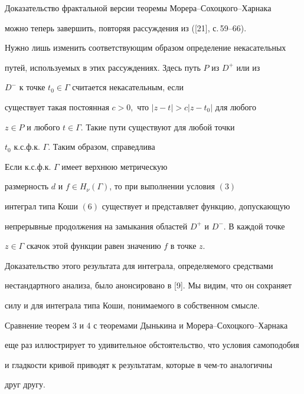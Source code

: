 Доказательство фрактальной версии теоремы Морера--Сохоцкого--Харнака


можно теперь завершить, повторяя рассуждения из ([21], с.\,59--66).


Нужно лишь изменить соответствующим образом определение некасательных


путей, используемых в этих рассуждениях. Здесь путь $P$ из $D^+$ или из


$D^-$ к точке $t_0\in\Gamma$ считается некасательным, если


существует такая постоянная $c>0,$ что $|z - t|>c|z - t_0|$ для любого


$z\in P$ и любого $t\in\Gamma$. Такие пути существуют для любой точки


$t_0$ к.с.ф.к. $\Gamma$. Таким образом, справедлива





\begin{thm}


Если к.с.ф.к. $\Gamma$ имеет верхнюю метрическую


размерность $d$ и $f\in H_{\nu}(\Gamma)$, то при выполнении условия $(3)$


интеграл типа Коши $(6)$ существует и представляет функцию, допускающую


непрерывные продолжения на замыкания областей $D^+$ и $D^-$. В каждой точке


$z\in\Gamma$ скачок этой функции равен значению $f$ в точке $z$.


\end{thm}





Доказательство этого результата для интеграла, определяемого средствами


нестандартного анализа, было анонсировано в [9]. Мы видим, что он сохраняет


силу и для интеграла типа Коши, понимаемого в собственном смысле.





Сравнение теорем 3 и 4 с теоремами Дынькина и Морера--Сохоцкого--Харнака


еще раз иллюстрирует то удивительное обстоятельство, что условия самоподобия


и гладкости кривой приводят к результатам, которые в чем-то аналогичны


друг другу.





